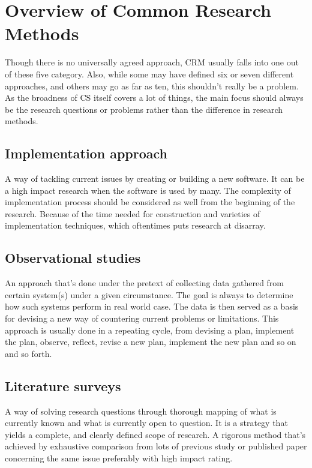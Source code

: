 \documentclass[a4paper,12pt]{article}
\begin{document}
    \section{Overview of Common Research Methods}
        Though there is no universally agreed approach, CRM usually falls into one out of these five category. Also, while some may have defined six or seven different approaches, and others may go as far as ten, this shouldn't really be a problem. As the broadness of CS itself covers a lot of things, the main focus should always be the research questions or problems rather than the difference in research methods.

        \subsection{Implementation approach}
            A way of tackling current issues by creating or building a new software. It can be a high impact research when the software is used by many. The complexity of implementation process should be considered as well from the beginning of the research. Because of the time needed for construction and varieties of implementation techniques, which oftentimes puts research at disarray.

        \subsection{Observational studies}
            An approach that's done under the pretext of collecting data gathered from certain system(s) under a given circumstance. The goal is always to determine how such systems perform in real world case. The data is then served as a basis for devising a new way of countering current problems or limitations.
            This approach is usually done in a repeating cycle, from devising a plan, implement the plan, observe, reflect, revise a new plan, implement the new plan and so on and so forth.

        \subsection{Literature surveys}
            A way of solving research questions through thorough mapping of what is currently known and what is currently open to question. It is a strategy that yields a complete, and clearly defined scope of research. A rigorous method that's achieved by exhaustive comparison from lots of previous study or published paper concerning the same issue preferably with high impact rating.
\end{document}
